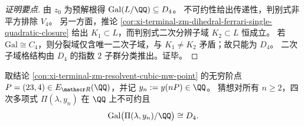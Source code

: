 \begin{proof}[证明要点]
由 \(z_0\) 为预解根得 \(\mathrm{Gal}(L/\QQ)\subseteq D_4\)。
不可约性给出传递性，判别式非平方排除 \(V_4\)。
另一方面，推论 \ref{cor:xi-terminal-zm-dihedral-ferrari-single-quadratic-closure} 给出 \(K_1\subset L\)，而判别式二次分辨子域 \(K_2\subset L\) 恒成立。
若 \(\mathrm{Gal}\cong C_4\)，则分裂域仅含唯一二次子域，与 \(K_1\neq K_2\) 矛盾；故只能为 \(D_4\)。
二次子域格结构由 \(D_4\) 的指数 \(2\) 子群分类推出。证毕。
\end{proof}

\begin{conjecture}[沿无穷阶轨道的无例外二面体性]\label{conj:xi-terminal-zm-dihedral-d4-no-exception-orbit}
取结论 \ref{con:xi-terminal-zm-resolvent-cubic-mw-point} 的无穷阶点 \(P=(23,4)\in E_{\mathscr R}(\QQ)\)，并记 \(y_n:=y(nP)\in\QQ\)。
猜想对所有 \(n\ge 2\)，四次多项式 \(\Pi(\lambda,y_n)\) 在 \(\QQ\) 上不可约且
\[
\mathrm{Gal}\bigl(\Pi(\lambda,y_n)/\QQ\bigr)\cong D_4.
\]
\end{conjecture}

